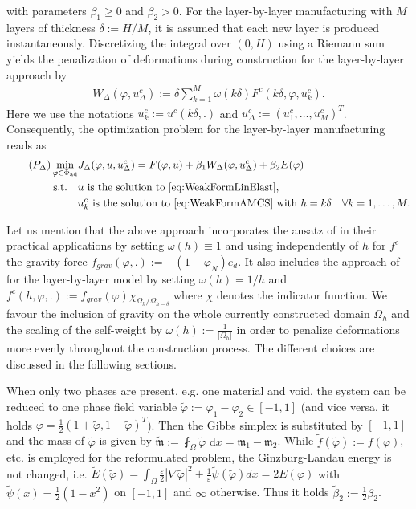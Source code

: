 \documentclass[a4paper,11pt]{article}
\theoremstyle{remark}
\newcommand{\dx}{\text{ d}x}
\newcommand{\Pad}{\Phi_{\text{ad}}}
\def\fint#1{\strokedint#1}
\begin{document}
with parameters $\beta_1 \geq 0$ and $\beta_2>0$.
For the layer-by-layer manufacturing with $M$ layers of thickness $\delta:=H/M$, it is assumed that each new layer is produced instantaneously. 
Discretizing the integral over $(0,H)$ using a Riemann sum yields the penalization
of deformations during construction
for the layer-by-layer approach by
\begin{align}
\label{eq:LayerCompDisc}
W_\Delta (\varphi, u^c_\Delta) :=
\delta
\sum_{k=1}^M \omega(k\delta) F^c(k\delta,\varphi, u^c_k) .
\end{align}
Here we use the notations $u^c_k:=u^c(k\delta,.)$ and $u^c_\Delta:=(u^c_1,\ldots,u^c_M)^T$.
Consequently, the optimization problem for the layer-by-layer manufacturing reads as
\begin{align}
\tag{$P_\Delta$}
\label{eq:OptimProb}
\min_{\varphi \in \Pad} & J_\Delta(\varphi, u, u^c_\Delta)=
F(\varphi, u) +
\beta_{1}  W_\Delta(\varphi,u^c_\Delta) +
\beta_{2}E(\varphi)
\\ 
\text{s.t.} \quad
& u \text{ is the solution to } \eqref{eq:WeakFormLinElast} \text{, } \nonumber  \\
& u^c_k \text{ is the solution to }
\eqref{eq:WeakFormAMCS}
\text{ with } h=k\delta \quad \forall k=1,\ldots , M .
\nonumber
\end{align}

Let us mention that the above approach incorporates the ansatz of \cite{Allaire2,AllaireOverview2} in their practical applications by setting $\omega(h) \equiv 1$ and using independently of $h$ for $ f^c$ the gravity force $f_{grav}(\varphi, .):= -(1-\varphi_N) e_d$.
It also includes the approach of \cite{WIAS} for the layer-by-layer model by setting $\omega (h) = 1/h$ and $f^c(h,\varphi ,.):= f_{grav}(\varphi) \chi_{\Omega_h/ \Omega_{h-\delta}}$ where $\chi$ denotes the indicator function.
We favour the inclusion of gravity on the whole currently constructed domain $\Omega_h$ and the scaling of the self-weight by $ \omega(h):= \tfrac{1}{|\Omega_h|}$ in order to penalize deformations more evenly throughout the construction process.
The different choices are discussed in the following sections.

When only two phases are present, e.g. one material and void, the system can be reduced to one phase field variable $\tilde \varphi := \varphi_1-\varphi_2 \in [-1,1]$ (and vice versa, it holds $\varphi=\tfrac12(1+\tilde \varphi,1-\tilde \varphi)^T$).
Then the Gibbs simplex is substituted by $[-1,1]$ and the mass of $\tilde \varphi $ is given by
$\tilde{\mathfrak{m}}:= \fint_\Omega \tilde \varphi \dx = \mathfrak{m}_1-\mathfrak{m}_2$.
While $\tilde f(\tilde \varphi) := f(\varphi) $, etc. is employed for the reformulated problem, the Ginzburg-Landau energy is not changed, i.e. 
$\tilde{E}(\tilde{\varphi}) = \int_{\Omega} \frac{\varepsilon}{2} |\nabla \tilde{\varphi}|^2 + \frac{1}{\varepsilon} \tilde{\psi}(\tilde{\varphi}) dx
= 2E(\varphi)$
with $\tilde{\psi}(x)=\tfrac12 (1-x^2) $ on $[-1,1]$ and $\infty$ otherwise.
Thus it holds $\tilde\beta_2:=\tfrac12\beta_2$. 
\end{document}
